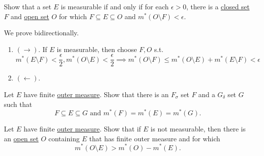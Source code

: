   \begin{exercise}[Royden 2.17]
    Show that a set $E$ is measurable if and only if for each $\epsilon > 0$, there is a \hyperref[pst-def:closed]{closed set} $F$ and \hyperref[pst-def:open-set]{open set} $O$ for which $F \subseteq E \subseteq O$ and $m^{\ast}(O \setminus F) < \epsilon$.
  \end{exercise}
  \begin{solution}
    We prove bidirectionally. 
    \begin{enumerate}
      \item $(\rightarrow)$. If $E$ is measurable, then choose $F, O$ s.t. 
        \begin{equation}
          m^\ast (E \setminus F) < \frac{\epsilon}{2}, m^\ast (O \setminus E) < \frac{\epsilon}{2} \implies m^\ast(O \setminus F) \leq m^\ast (O \setminus E) + m^\ast (E \setminus F) < \epsilon
        \end{equation}
      \item $(\leftarrow)$. 
    \end{enumerate}
  \end{solution}

  \begin{exercise}[Royden 2.18]
    Let $E$ have finite \hyperref[def:outer-measure]{outer measure}. Show that there is an $F_{\sigma}$ set $F$ and a $G_{\delta}$ set $G$ such that
    \begin{equation*}
      F \subseteq E \subseteq G \text{ and } m^{\ast}(F) = m^{\ast}(E) = m^{\ast}(G).
    \end{equation*}
  \end{exercise}

  \begin{exercise}[Royden 2.19]
    Let $E$ have finite \hyperref[def:outer-measure]{outer measure}. Show that if $E$ is not measurable, then there is an \hyperref[pst-def:open-set]{open set} $O$ containing $E$ that has finite outer measure and for which
    \begin{equation*}
      m^{\ast}(O \setminus E) > m^{\ast}(O) - m^{\ast}(E).
    \end{equation*}
  \end{exercise} 
  \begin{solution}
    
  \end{solution}

